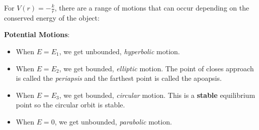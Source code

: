 \documentclass[../main.tex]{subfiles}
\begin{document}
For $V(r) = - \frac{k}{r}$, there are a range of motions that can occur depending on the conserved energy of the object:
\begin{center}
\end{center}
\textbf{Potential Motions}:
\label{potentialOrbitMotions}
\begin{itemize}
  \item When $E = E_1$, we get unbounded, \textit{hyperbolic} motion.
  \item When $E = E_2$, we get bounded, \textit{elliptic} motion.
    The point of closes approach is called the \textit{periapsis} and the farthest point is called the apoapsis.
  \item When $E = E_3$, we get bounded, \textit{circular} motion.
    This is a \textbf{stable} equilibrium point so the circular orbit is stable.
  \item When $E = 0$, we get unbounded, \textit{parabolic} motion.
\end{itemize}
\end{document}
